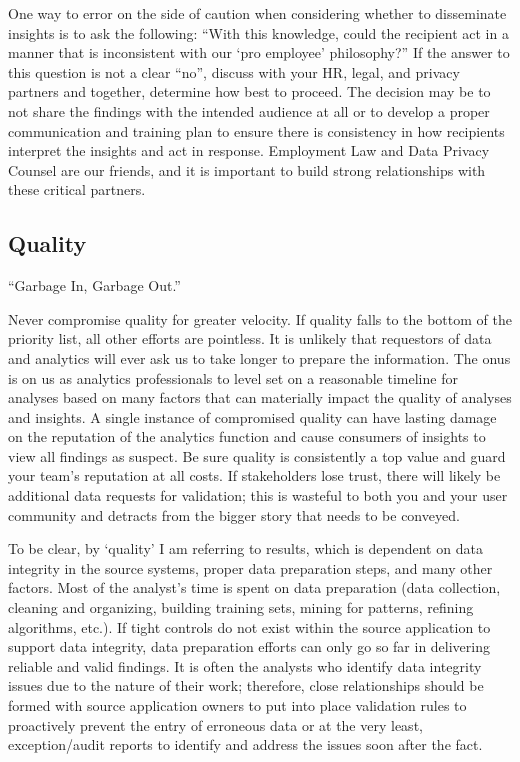 \documentclass[
]{book}
\begin{document}
One way to error on the side of caution when considering whether to disseminate insights is to ask the following: ``With this knowledge, could the recipient act in a manner that is inconsistent with our `pro employee' philosophy?'' If the answer to this question is not a clear ``no'', discuss with your HR, legal, and privacy partners and together, determine how best to proceed. The decision may be to not share the findings with the intended audience at all or to develop a proper communication and training plan to ensure there is consistency in how recipients interpret the insights and act in response. Employment Law and Data Privacy Counsel are our friends, and it is important to build strong relationships with these critical partners.

\hypertarget{quality}{%
\subsection{Quality}\label{quality}}

``Garbage In, Garbage Out.''

Never compromise quality for greater velocity. If quality falls to the bottom of the priority list, all other efforts are pointless. It is unlikely that requestors of data and analytics will ever ask us to take longer to prepare the information. The onus is on us as analytics professionals to level set on a reasonable timeline for analyses based on many factors that can materially impact the quality of analyses and insights. A single instance of compromised quality can have lasting damage on the reputation of the analytics function and cause consumers of insights to view all findings as suspect. Be sure quality is consistently a top value and guard your team's reputation at all costs. If stakeholders lose trust, there will likely be additional data requests for validation; this is wasteful to both you and your user community and detracts from the bigger story that needs to be conveyed.

To be clear, by `quality' I am referring to results, which is dependent on data integrity in the source systems, proper data preparation steps, and many other factors. Most of the analyst's time is spent on data preparation (data collection, cleaning and organizing, building training sets, mining for patterns, refining algorithms, etc.). If tight controls do not exist within the source application to support data integrity, data preparation efforts can only go so far in delivering reliable and valid findings. It is often the analysts who identify data integrity issues due to the nature of their work; therefore, close relationships should be formed with source application owners to put into place validation rules to proactively prevent the entry of erroneous data or at the very least, exception/audit reports to identify and address the issues soon after the fact.
\end{document}
